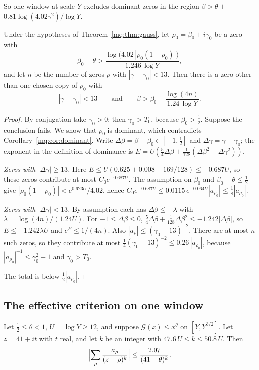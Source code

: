So one window at scale $Y$ excludes dominant zeros in the region $\beta>\theta+{}$\allowbreak$0.81\log(4.02\gamma^2)/\log Y$.

\begin{theorem}\label{mq:thm:lonely}
Under the hypotheses of Theorem~\ref{mq:thm:gauss}, let $\rho_0=\beta_0+i\gamma_0$ be a zero with
\[
\beta_0-\theta>\frac{\log\bigl(4.02\,|\rho_0(1-\rho_0)|\bigr)}{1.246\,\log Y},
\]
and let $n$ be the number of zeros $\rho$ with $|\gamma-\gamma_0|<13$. Then there is a zero other than one chosen copy of $\rho_0$ with
\[
|\gamma-\gamma_0|<13\qquad\text{and}\qquad\beta>\beta_0-\frac{\log(4n)}{1.24\,\log Y}.
\]
\end{theorem}

\begin{proof}
By conjugation take $\gamma_0>0$; then $\gamma_0>T_0$, because $\beta_0>\frac12$. Suppose the conclusion fails. We show that $\rho_0$ is dominant, which contradicts Corollary~\ref{mq:cor:dominant}. Write $\Delta\beta=\beta-\beta_0\in[-1,\frac12]$ and $\Delta\gamma=\gamma-\gamma_0$; the exponent in the definition of dominance is $E=U(\frac54\Delta\beta+\frac1{128}(\Delta\beta^2-\Delta\gamma^2))$.

\emph{Zeros with $|\Delta\gamma|\ge13$.} Here $E\le U(0.625+0.008-169/128)\le-0.687U$, so these zeros contribute at most $C_0e^{-0.687U}$. The assumption on $\beta_0$ and $\beta_0-\theta\le\frac12$ give $|\rho_0(1-\rho_0)|<e^{0.623U}/4.02$, hence $C_0e^{-0.687U}\le0.0115\,e^{-0.064U}|a_{\rho_0}|\le\frac18|a_{\rho_0}|$.

\emph{Zeros with $|\Delta\gamma|<13$.} By assumption each has $\Delta\beta\le-\lambda$ with $\lambda=\log(4n)/(1.24U)$. For $-1\le\Delta\beta\le0$, $\frac54\Delta\beta+\frac1{128}\Delta\beta^2\le-1.242|\Delta\beta|$, so $E\le-1.242\lambda U$ and $e^E\le1/(4n)$. Also $|a_\rho|\le(\gamma_0-13)^{-2}$. There are at most $n$ such zeros, so they contribute at most $\frac14(\gamma_0-13)^{-2}\le0.26\,|a_{\rho_0}|$, because $|a_{\rho_0}|^{-1}\le\gamma_0^2+1$ and $\gamma_0>T_0$.

The total is below $\frac12|a_{\rho_0}|$.
\end{proof}

\subsection{The effective criterion on one window}

\begin{lemma}\label{mq:lem:gamma}
Let $\frac12\le\theta<1$, $U=\log Y\ge12$, and suppose $\mathcal G(x)\le x^\theta$ on $[Y,Y^{3/2}]$. Let $z=41+it$ with $t$ real, and let $k$ be an integer with $47.6\,U\le k\le50.8\,U$. Then
\[
\Bigl|\sum_\rho\frac{a_\rho}{(z-\rho)^k}\Bigr|\le\frac{2.07}{(41-\theta)^k}.
\]
\end{lemma}

